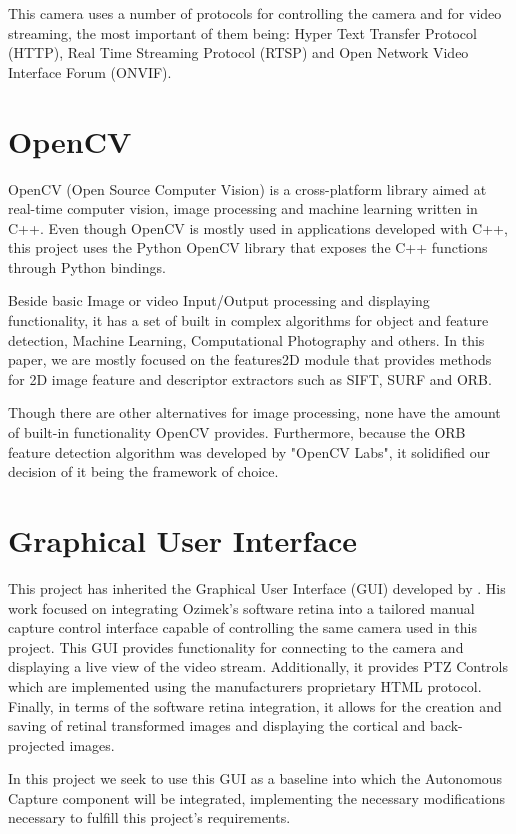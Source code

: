 \documentclass{l4proj}
\begin{document}
This camera uses a number of protocols for controlling the camera and for video streaming, the most important of them being: Hyper Text Transfer Protocol (HTTP), Real Time Streaming Protocol (RTSP) and Open Network Video Interface Forum (ONVIF). 


\section{OpenCV}

OpenCV (Open Source Computer Vision) is a cross-platform library aimed at real-time computer vision, image processing and machine learning written in C++. Even though OpenCV is mostly used in applications developed with C++, this project uses the Python OpenCV library that exposes the C++ functions through Python bindings.    

Beside basic Image or video Input/Output processing and displaying functionality, it has a set of built in complex algorithms for object and feature detection, Machine Learning, Computational Photography and others. In this paper, we are mostly focused on the features2D module that provides methods for 2D image feature and descriptor extractors such as SIFT, SURF and ORB.

Though there are other alternatives for image processing, none have the amount of built-in functionality OpenCV provides. Furthermore, because the ORB feature detection algorithm was developed by "OpenCV Labs", it solidified our decision of it being the framework of choice. 

\section{Graphical User Interface} \label{GUIbackground}

This project has inherited the Graphical User Interface (GUI) developed by \cite{JianwenZhou}. His work focused on integrating Ozimek's software retina into a tailored manual capture control interface capable of controlling the same camera used in this project. This GUI provides functionality for connecting to the camera and displaying a live view of the video stream. Additionally, it provides PTZ Controls which are implemented using the manufacturers proprietary HTML protocol. Finally, in terms of the software retina integration, it allows for the creation and saving of retinal transformed images and displaying the cortical and back-projected images.

In this project we seek to use this GUI as a baseline into which the Autonomous Capture component will be integrated, implementing the necessary modifications necessary to fulfill this project's requirements. 
\end{document}
